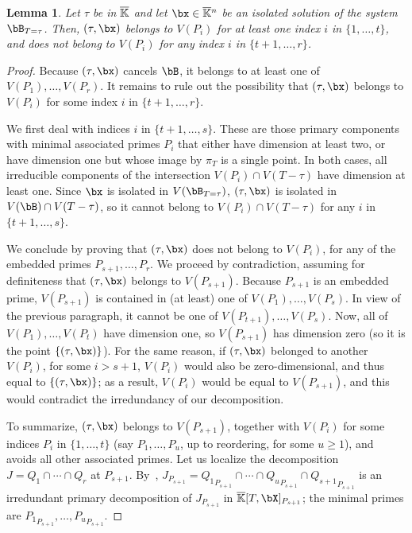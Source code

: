 \documentclass[12pt]{article}
\newtheorem{lemma}[definition]{Lemma}
\begin{document}
\begin{lemma}\label{lemma:vPi}
  Let $\tau$ be in $\overline{\mathbb{K}}$ and let $\bx \in \KKbar{}^n$ be an isolated
  solution of the system $\bB_{T=\tau}$. Then, $(\tau,\bx)$ belongs to $V(P_i)$
  for at least one index $i$ in $\{1,\dots,t\}$, and does not belong
  to $V(P_i)$ for any index $i$ in $\{t+1,\dots,r\}$.
\end{lemma}
\begin{proof}
  Because $(\tau,\bx)$ cancels $\bB$, it belongs to at least one of
  $V(P_1),\dots,V(P_r)$. It remains to rule out the possibility that
  $(\tau,\bx)$ belongs to $V(P_i)$ for some index $i$ in
  $\{t+1,\dots,r\}$.

  We first deal with indices $i$ in $\{t+1,\dots,s\}$. These are those
  primary components with minimal associated primes $P_i$ that either
  have dimension at least two, or have dimension one but whose image
  by $\pi_T$ is a single point. In both cases, all irreducible
  components of the intersection $V(P_i)\cap V(T-\tau)$ have dimension
  at least one. Since $\bx$ is isolated in $V(\bB_{T=\tau})$, $(\tau,\bx)$ is
  isolated in $V(\bB)\cap V(T-\tau)$, so it cannot belong to
  $V(P_i)\cap V(T-\tau)$ for any $i$ in $\{t+1,\dots,s\}$.
  
  We conclude by proving that $(\tau,\bx)$ does not belong to $V(P_i)$,
  for any of the embedded primes $P_{s+1},\dots,P_r$. We proceed by
  contradiction, assuming for definiteness that $(\tau,\bx)$ belongs to
  $V(P_{s+1})$. Because $P_{s+1}$ is an embedded prime, $V(P_{s+1})$
  is contained in (at least) one of $V(P_1),\dots,V(P_s)$. In view of
  the previous paragraph, it cannot be one of
  $V(P_{t+1}),\dots,V(P_s)$.  Now, all of $V(P_1),\dots,V(P_t)$ have
  dimension one, so $V(P_{s+1})$ has dimension zero (so it is the point $\{(\tau,\bx)\}$). For the same
  reason, if $(\tau,\bx)$ belonged to another $V(P_i)$, for some $i >
  s+1$, $V(P_i)$ would also be zero-dimensional, and thus equal to $\{(\tau,\bx)\}$; as a result, $V(P_i)$
  would be equal to $V(P_{s+1})$, and this would contradict the
  irredundancy of our decomposition.
  
  To summarize, $(\tau,\bx)$ belongs to $V(P_{s+1})$, together with
  $V(P_i)$ for some indices $P_i$ in $\{1,\dots,t\}$ (say
  $P_1,\dots,P_u$, up to reordering, for some $u \ge 1$), and avoids
  all other associated primes.  Let us localize the decomposition
  $J=Q_1 \cap \cdots \cap Q_r$ at
  $P_{s+1}$. By~\cite[Proposition~4.9]{AtMc},
  $J_{P_{s+1}}={Q_1}_{P_{s+1}} \cap \cdots \cap {Q_u}_{P_{s+1}}\cap
  {Q_{s+1}}_{P_{s+1}}$ is an irredundant primary decomposition of
  $J_{P_{s+1}}$ in $\KKbar[T,\bX]_{P_{s+1}}$; the minimal primes are
  ${P_1}_{P_{s+1}},\dots,{P_u}_{P_{s+1}}$.


\end{proof}
\end{document}
